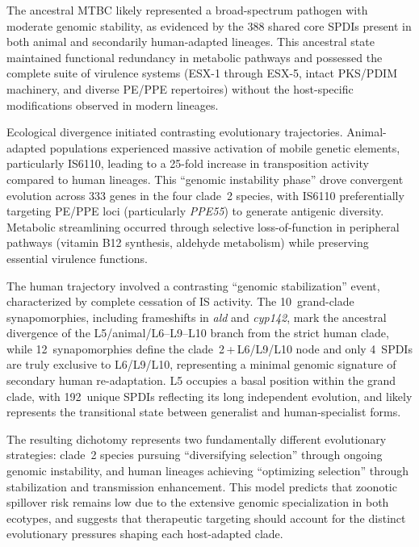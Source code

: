 \documentclass[11pt,a4paper]{article}
\begin{document}
The ancestral MTBC likely represented a broad-spectrum pathogen with moderate
genomic stability, as evidenced by the 388 shared core SPDIs present in both
animal and secondarily human-adapted lineages. This ancestral state maintained functional
redundancy in metabolic pathways and possessed the complete suite of virulence
systems (ESX-1 through ESX-5, intact PKS/PDIM machinery, and diverse PE/PPE
repertoires) without the host-specific modifications observed in modern lineages.

Ecological divergence initiated contrasting evolutionary trajectories.
Animal-adapted populations experienced massive activation of mobile genetic
elements, particularly IS6110, leading to a 25-fold increase in transposition
activity compared to human lineages. This ``genomic instability phase'' drove
convergent evolution across 333 genes in the four clade~2 species,
with IS6110 preferentially targeting PE/PPE loci (particularly \textit{PPE55})
to generate antigenic diversity. Metabolic streamlining occurred through
selective loss-of-function in peripheral pathways (vitamin B12 synthesis,
aldehyde metabolism) while preserving essential virulence functions.

The human trajectory involved a contrasting ``genomic stabilization'' event,
characterized by complete cessation of IS activity. The 10~grand-clade
synapomorphies, including frameshifts in \textit{ald} and \textit{cyp142},
mark the ancestral divergence of the L5/animal/L6--L9--L10 branch from
the strict human clade, while 12~synapomorphies define the
clade~2\,+\,L6/L9/L10 node and only 4~SPDIs are truly exclusive to
L6/L9/L10, representing a minimal genomic signature of secondary human
re-adaptation.
L5 occupies a basal position within the grand clade, with 192~unique
SPDIs reflecting its long independent evolution, and likely represents
the transitional state between generalist and human-specialist forms.

The resulting dichotomy represents two fundamentally different evolutionary
strategies: clade~2 species pursuing ``diversifying selection'' through ongoing
genomic instability, and human lineages achieving ``optimizing selection''
through stabilization and transmission enhancement. This model predicts that
zoonotic spillover risk remains low due to the extensive genomic specialization
in both ecotypes, and suggests that therapeutic targeting should account for
the distinct evolutionary pressures shaping each host-adapted clade.
\end{document}
